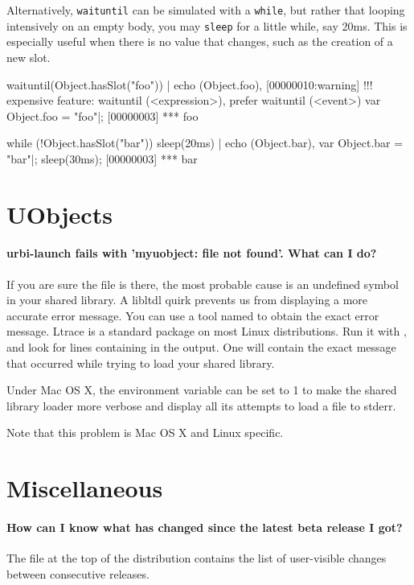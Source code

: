 Alternatively, \lstinline|waituntil| can be simulated with a
\lstinline|while|, but rather that looping intensively on an empty
body, you may \lstinline|sleep| for a little while, say 20ms.  This is
especially useful when there is no value that changes, such as the
creation of a new slot.

\begin{urbiscript}[firstnumber=last]
waituntil(Object.hasSlot("foo")) | echo (Object.foo),
[00000010:warning] !!! expensive feature: waituntil (<expression>), prefer waituntil (<event>)
var Object.foo = "foo"|;
[00000003] *** foo
\end{urbiscript}

\begin{urbiscript}[firstnumber=last]
while (!Object.hasSlot("bar"))
  sleep(20ms) |
echo (Object.bar),
var Object.bar = "bar"|;
sleep(30ms);
[00000003] *** bar
\end{urbiscript}

\section{UObjects}

\paragraph{urbi-launch fails with 'myuobject: file not found'. What can I do?}
If you are sure the file is there, the most probable cause is an
undefined symbol in your shared library. A libltdl quirk prevents us
from displaying a more accurate error message.  You can use a tool
named  to obtain the exact error message.  Ltrace is a
standard package on most Linux distributions.  Run it with
, and look for lines
containing  in the output. One will contain the exact
message that occurred while trying to load your shared library.

Under Mac OS X, the  environment variable can
be set to 1 to make the shared library loader more verbose and display
all its attempts to load a file to stderr.

Note that this problem is Mac OS X and Linux specific.

\section{Miscellaneous}
\paragraph{How can I know what has changed since the latest beta release I got?}
The file  at the top of the distribution
contains the list of user-visible changes between consecutive
releases.

